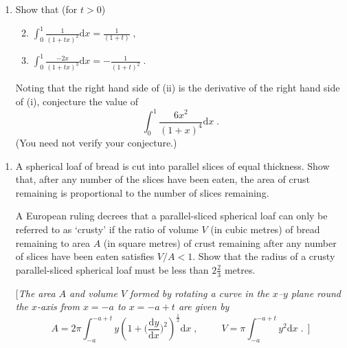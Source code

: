 \documentclass[a4, 11pt]{report}
\newlength{\qspace}
\newcounter{qnumber}
\newenvironment{question}%
 {\vspace{\qspace}
  \begin{enumerate}[\bfseries 1\quad][10]%
    \setcounter{enumi}{\value{qnumber}}%
    \item%
 }
{
  \end{enumerate}
  \filbreak
  \stepcounter{qnumber}
 }
\newenvironment{questionparts}[1][1]%
 {
  \begin{enumerate}[\bfseries (i)]%
    \setcounter{enumii}{#1}
    \addtocounter{enumii}{-1}
    \setlength{\itemsep}{5mm}
    \setlength{\parskip}{8pt}
 }
 {
  \end{enumerate}
 }
\def\d{{\mathrm d}}
\begin{document}
\begin{question}
Show that (for $t>0$)
\begin{questionparts}
\item
$\displaystyle
\int_0^1 \frac1{(1+tx)^2} \d x = \frac1{(1+t)}\;,
$
\item
$\displaystyle
\int_0^1 \frac{-2x}{(1+tx)^3} \d x = -\frac1{(1+t)^2}\;.
$
\end{questionparts}

Noting that the right hand side of (ii) is the derivative of the right hand side of 
(i), 
conjecture the value of
\[
 \int_0^1 \frac{6x^2}{(1+x)^{4}} \d x \;.
\]
(You need not verify your conjecture.)
	\end{question}
	
\begin{question}
A spherical loaf of bread is cut into parallel slices of  equal thickness. Show that,
after any number of the  slices have been eaten, 
the area of crust remaining is proportional to the number of slices remaining.

A European ruling decrees that a parallel-sliced
spherical loaf can only be referred to as `crusty' if the ratio of
volume $V$ (in cubic metres) of bread remaining to area $A$ (in square metres)
of  crust remaining after any number of slices have been eaten satisfies
$V/A<1$. Show that the radius of a crusty parallel-sliced
spherical loaf must be less than $2\frac23$ metres.

[{\sl The area $A$ and volume $V$ formed by rotating a curve in the $x$--$y$ plane 
round the $x$-axis from $x=-a$ to $x=-a+t$ 
are given by
\[
A= 2\pi\int_{-a}^{-a+t} 
{ y}\left( 1+ \Big(\frac{\d {y}}{\d x}\Big)^2\right)^{\frac12}
\d x\;,
\ \ \ \ \ \ \ \ \ \ \
V= \pi \int_{-a}^{-a+t} {y}^2 \d x \;. \ \ 
]
\]
}
\end{question}
	
\end{document}
